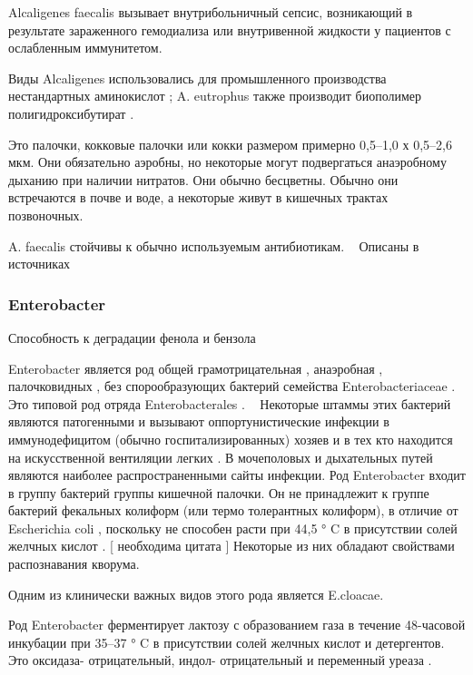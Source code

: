 \documentclass[11pt]{article}
\begin{document}
	Alcaligenes faecalis вызывает внутрибольничный сепсис, возникающий в результате зараженного гемодиализа или внутривенной жидкости у пациентов с ослабленным иммунитетом. ~\cite{Alcaligenes_3}
	
	Виды Alcaligenes использовались для промышленного производства нестандартных аминокислот ; A. eutrophus также производит биополимер полигидроксибутират .
	
	Это палочки, кокковые палочки или кокки размером примерно 0,5–1,0 х 0,5–2,6 мкм. Они обязательно аэробны, но некоторые могут подвергаться анаэробному дыханию при наличии нитратов. Они обычно бесцветны. Обычно они встречаются в почве и воде, а некоторые живут в кишечных трактах позвоночных. ~\cite{Alcaligenes_4}
		
	A. faecalis стойчивы к обычно используемым антибиотикам. ~\cite{Alcaligenes_7}
	Описаны в источниках ~\cite{Alcaligenes_1, Alcaligenes_2, Alcaligenes_3, Alcaligenes_4, Alcaligenes_5, Alcaligenes_6, Alcaligenes_7}
	
	\subsubsection{Enterobacter}
	Способность к деградации фенола и бензола ~\cite{09593330.2017.1337232}
	
	Enterobacter является род общей грамотрицательная , анаэробная , палочковидных , без спорообразующих бактерий семейства Enterobacteriaceae . Это типовой род отряда Enterobacterales . ~\cite{Enterobacter_1} Некоторые штаммы этих бактерий являются патогенными и вызывают оппортунистические инфекции в иммунодефицитом (обычно госпитализированных) хозяев и в тех кто находится на искусственной вентиляции легких . В мочеполовых и дыхательных путей являются наиболее распространенными сайты инфекции. Род Enterobacter входит в группу бактерий группы кишечной палочки. Он не принадлежит к группе бактерий фекальных колиформ (или термо толерантных колиформ), в отличие от Escherichia coli , поскольку не способен расти при 44,5 ° C в присутствии солей желчных кислот . [ необходима цитата ] Некоторые из них обладают свойствами распознавания кворума. ~\cite{Enterobacter_2, Enterobacter_3}
	
	Одним из клинически важных видов этого рода является E.cloacae.
	
	Род Enterobacter ферментирует лактозу с образованием газа в течение 48-часовой инкубации при 35–37 ° C в присутствии солей желчных кислот и детергентов. Это оксидаза- отрицательный, индол- отрицательный и переменный уреаза . ~\cite{Enterobacter_3, Enterobacter_6}
	
\end{document}
